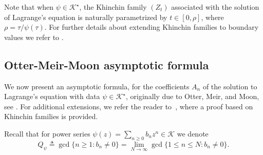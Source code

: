 \documentclass[11pt,a4paper,leqno]{amsart}
\theoremstyle{plain}
\newtheorem{lem}[theo]{Lemma}
\theoremstyle{definition}
\numberwithin{equation}{section}
\def\E{\mathbf{E}}
\def\K{\mathcal{K}}
\begin{document}
	Note that when \(\psi\in\mathcal K^\star\), the Khinchin family \((Z_t)\) associated with the solution of Lagrange’s equation is naturally parametrized by \(t\in[0,\rho]\), where \(\rho=\tau/\psi(\tau)\). For further details about extending Khinchin families to boundary values we refer to \cite{K_dos}.
	\smallskip
	
	\subsection{Otter-Meir-Moon asymptotic formula}
	
	We now present an asymptotic formula, for the coefficients \( A_n \) of the solution to Lagrange’s equation with data \( \psi \in \mathcal{K}^\star \), originally due to Otter, Meir, and Moon, see \cite{MeirMoon,Otter}. For additional extensions, we refer the reader to~\cite{K_dos}, where a proof based on Khinchin families is provided.
	\smallskip
	
	Recall that for power series $\psi(z) = \sum_{n \geq 0}b_nz^n \in \K$ we denote 
		\[
	Q_{\psi}\triangleq \gcd\{n \geq 1 : b_n \neq 0\} = \lim_{N \to \infty} \gcd\{1 \leq n \leq N : b_n \neq 0\}.
	\]
	
	
	
\end{document}
